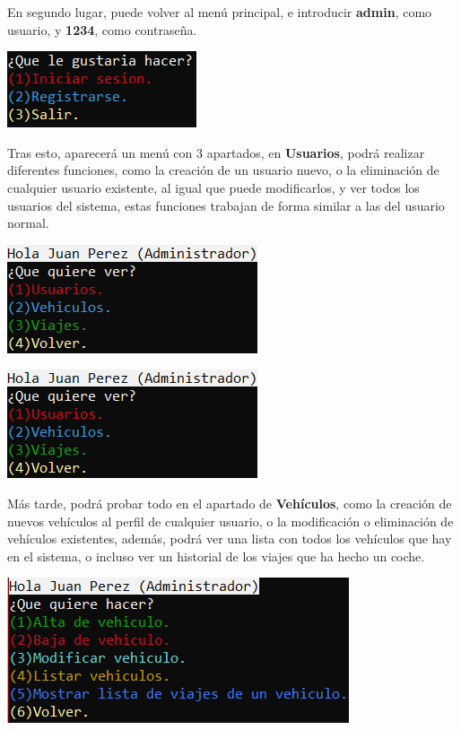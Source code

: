 En segundo lugar, puede volver al menú principal, e introducir \textbf{admin}, como usuario, y \textbf{1234}, como contraseña. 
\begin{center}
    \includegraphics[]{FOTOS/menuPrincipal.png}
\end{center}

Tras esto, aparecerá un menú con 3 apartados, en \textbf{Usuarios}, podrá realizar diferentes funciones, como la creación de un usuario nuevo, o la eliminación de cualquier usuario existente,
al igual que puede modificarlos, y ver todos los usuarios del sistema, estas funciones trabajan de forma similar a las del usuario normal. 
\begin{center}
    \begin{center}
      \includegraphics[]{FOTOS/menuAdmin.png}
    \end{center}
    \begin{center}
      \includegraphics[]{FOTOS/menuAdmin.png}
    \end{center}
\end{center}

\newpage

Más tarde, podrá probar todo en el apartado de \textbf{Vehículos}, como la creación de nuevos vehículos al perfil de cualquier usuario, o la modificación o eliminación de vehículos existentes,
además, podrá ver una lista con todos los vehículos que hay en el sistema, o incluso ver un historial de los viajes que ha hecho un coche. 
\begin{center}
  \includegraphics[]{FOTOS/menuAdminVehiculo.png}
\end{center}


